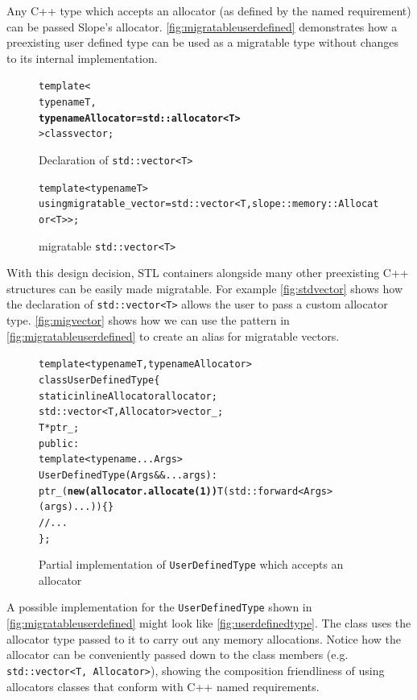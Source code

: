 Any C++ type which accepts an allocator (as defined by the named requirement)
can be passed Slope's allocator. \autoref{fig:migratableuserdefined}
demonstrates how a preexisting user defined type can be used as a
migratable type without changes to its internal implementation.


\begin{figure}[t]
\begin{alltt}
template<
    typename T,
    \textbf{typename Allocator = std::allocator<T>}
> class vector;
\end{alltt}
\caption{
    Declaration of \texttt{std::vector<T>}
}
\label{fig:stdvector}
\end{figure}


\begin{figure}[t]
\begin{alltt}
template<typename T>
using migratable_vector = std::vector<T, slope::memory::Allocator<T>>;

\end{alltt}
\caption{
    migratable \texttt{std::vector<T>}
}
\label{fig:migvector}
\end{figure}

With this design decision, STL containers alongside many other preexisting
C++ structures can be easily made migratable.
For example \autoref{fig:stdvector} shows how the declaration of
\texttt{std::vector<T>}
allows the user to pass a custom allocator type. \autoref{fig:migvector} shows
how we can use the pattern in \autoref{fig:migratableuserdefined} to create
an alias for migratable vectors.



\begin{figure}[t]
\begin{alltt}
template<typename T, typename Allocator>
class UserDefinedType \{
  static inline Allocator allocator;
  std::vector<T, Allocator> vector_;
  T *ptr_;
 public:
  template<typename... Args>
  UserDefinedType(Args&&... args):
    ptr_(\textbf{new (allocator.allocate(1))} T(std::forward<Args>(args)...)) \{ \}
  // ...
\};
\end{alltt}
\caption{ Partial implementation of \texttt{UserDefinedType} which accepts an allocator}
\label{fig:userdefinedtype}
\end{figure}


A possible implementation for the \texttt{UserDefinedType} shown in
\autoref{fig:migratableuserdefined} might look like \autoref{fig:userdefinedtype}.
The class uses the allocator type passed to it to carry out any memory
allocations. Notice how the allocator can be conveniently passed down to the
class members (e.g. \texttt{std::vector<T, Allocator>}), showing the composition
friendliness of using allocators classes that conform with C++ named requirements.











